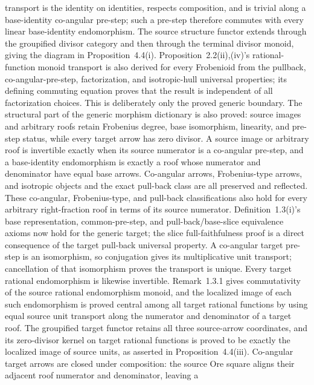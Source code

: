 \begin{definition}
  transport is the identity on identities, respects composition, and is
  trivial along a base-identity co-angular pre-step; such a pre-step therefore
  commutes with every linear base-identity endomorphism.
  The source structure functor extends through the groupified divisor
  category and then through the terminal divisor monoid, giving the diagram in
  Proposition~4.4(i).  Proposition~2.2(ii),(iv)'s rational-function monoid
  transport is also derived for every Frobenioid from the pullback,
  co-angular-pre-step, factorization, and isotropic-hull universal properties;
  its defining commuting equation proves that the result is independent of
  all factorization choices.  This is deliberately only the proved generic
  boundary.  The structural part of the generic morphism dictionary is also
  proved: source images and arbitrary roofs retain Frobenius degree, base
  isomorphism, linearity, and pre-step status, while every target arrow has
  zero divisor.  A source image or arbitrary roof is invertible exactly when
  its source numerator is a co-angular pre-step, and a base-identity
  endomorphism is exactly a roof whose numerator and denominator have equal
  base arrows.  Co-angular arrows, Frobenius-type arrows, and isotropic
  objects and the exact pull-back class are all preserved and reflected.
  These co-angular, Frobenius-type, and pull-back classifications also hold
  for every arbitrary right-fraction roof in terms of its source numerator.
  Definition~1.3(i)'s base representation, common-pre-step, and
  pull-back/base-slice equivalence axioms now hold for the generic target;
  the slice full-faithfulness proof is a direct consequence of the target
  pull-back universal property.
  A co-angular target pre-step is an isomorphism, so conjugation gives its
  multiplicative unit transport; cancellation of that isomorphism proves the
  transport is unique.  Every target rational endomorphism is likewise
  invertible.  Remark~1.3.1 gives commutativity of the source rational
  endomorphism monoid, and the localized image of each such endomorphism is
  proved central among all target rational functions by using equal source
  unit transport along the numerator and denominator of a target roof.  The
  groupified target functor retains all three source-arrow coordinates, and
  its zero-divisor kernel on target rational functions is proved to be
  exactly the localized image of source units, as asserted in
  Proposition~4.4(iii).
  Co-angular target arrows are closed under composition: the source Ore
  square aligns their adjacent roof numerator and denominator, leaving a

\end{definition}
